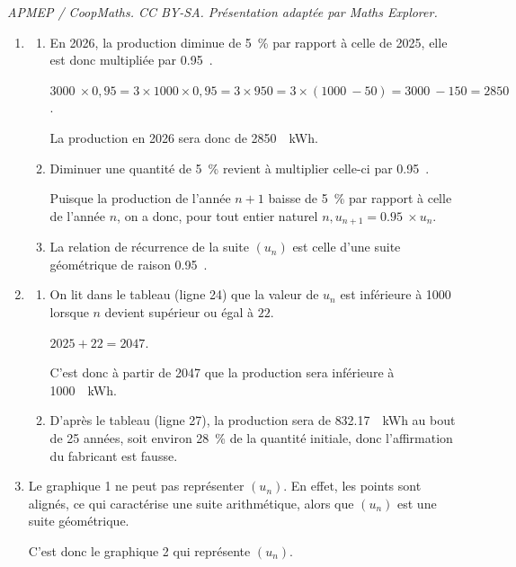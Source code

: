 \documentclass[10pt]{article}
\providecommand{\np}[2][]{{#2~#1}}
\begin{document}
\noindent\textit{APMEP / CoopMaths. CC BY-SA. Présentation adaptée par Maths Explorer.}\par\medskip
\begin{enumerate}
		\item \begin{enumerate}
			\item En 2026, la production diminue de 5~\% par rapport à celle de 2025, elle est donc multipliée par \np{0.95}.

			$\np{3000} \times 0,95 = 3 \times 1000 \times 0,95 = 3 \times 950 = 3\times (\np{1000} - 50) = \np{3000} - 150 = \np{2850}$.

			La production en 2026 sera donc de \np[~kWh]{2850}.

			\item Diminuer une quantité de 5~\% revient à multiplier celle-ci par \np{0.95}.

			Puisque la production de l'année $n+1$ baisse de 5~\% par rapport à celle de l'année $n$, on a donc, pour tout entier naturel  \quad \mbox{$n, u_{n+1} = \np{0.95} \times u_n$}.

			\item La relation de récurrence de la suite $(u_n)$ est celle d'une suite géométrique de raison \np{0.95}.
		\end{enumerate}

		\item \begin{enumerate}
			\item On lit dans le tableau (ligne 24) que la valeur de $u_n$ est inférieure à \np{1000} lorsque $n$ devient supérieur ou égal à $22$.

			$2025 + 22 = 2047$.

			C'est donc à partir de 2047 que la production sera inférieure à \np[~kWh]{1000}.

			\item D'après le tableau (ligne 27), la production sera de \np[~kWh]{832.17} au bout de 25 années, soit environ 28~\% de la quantité initiale, donc l'affirmation du fabricant est fausse.
		\end{enumerate}

		\item Le graphique 1 ne peut pas représenter $(u_n)$. En effet, les points sont alignés, ce qui caractérise une suite arithmétique, alors que $(u_n)$ est une suite géométrique.

		C'est donc le graphique 2 qui représente $(u_n)$.
	\end{enumerate}
\end{document}
